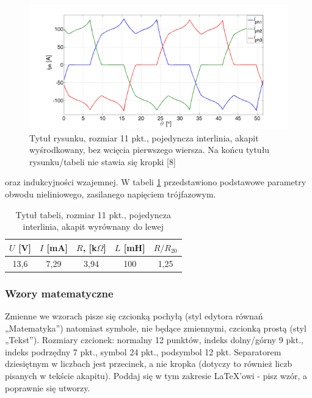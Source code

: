 \documentclass[12pt,twoside]{article}
\begin{document}
\begin{figure}[ht]
	\centering
	\includegraphics[width=12cm]{figures/fig2.png}
	\caption{Tytuł rysunku, rozmiar 11 pkt., pojedyncza interlinia, akapit wyśrodkowany, bez wcięcia pierwszego wiersza. Na końcu tytułu rysunku/tabeli nie stawia się kropki [8]}
\label{Fig:wykres}
\end{figure}


\begin{example}
[\ldots] oraz indukcyjności wzajemnej. W tabeli \ref{Tab:tabela} przedstawiono podstawowe parametry obwodu nieliniowego, zasilanego napięciem trójfazowym.
\end{example}

\begin{table}[ht]
\caption{Tytuł tabeli, rozmiar 11 pkt., pojedyncza interlinia, akapit wyrównany do lewej}
\centering		
	\begin{tabular}{|c|c|c|c|c|}	
		\hline
		$U$ [V] & $I$ [mA] & $R$, [k$\Omega$] & $L$ [mH] & $R/R_{20}$ \\
		\hline
		13,6 & 7,29 & 3,94 & 100 & 1,25 \\
		\hline
	\end{tabular}	
	
\label{Tab:tabela}
\end{table}	

{\subsubsection{Wzory matematyczne}}

Zmienne we wzorach pisze się czcionką pochyłą (styl edytora równań „Matematyka”) natomiast symbole, nie będące zmiennymi, czcionką prostą (styl „Tekst”).
Rozmiary czcionek: normalny 12 punktów, indeks dolny/górny 9 pkt., indeks podrzędny 7 pkt., symbol 24 pkt., podsymbol 12 pkt. Separatorem dziesiętnym w liczbach jest
przecinek, a nie kropka (dotyczy to również liczb pisanych w tekście akapitu). Poddaj się w tym zakresie \LaTeX'owi - pisz wzór, a poprawnie się utworzy.
\end{document}
